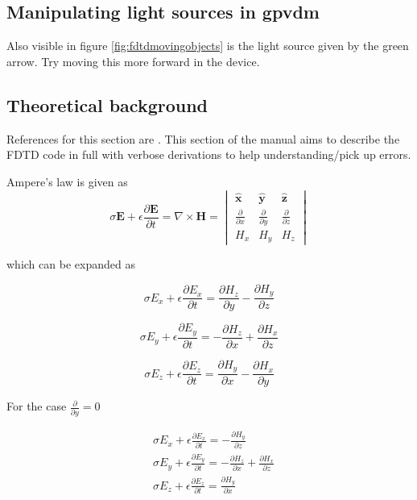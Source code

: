 \subsection{Manipulating light sources in gpvdm}
 Also visible in figure \ref{fig:fdtdmovingobjects} is the light source given by the green arrow. Try moving this more forward in the device.

\subsection{Theoretical background}
References for this section are \cite{FDTD_Schneider}. This section of the manual aims to describe the FDTD code in full with verbose derivations to help understanding/pick up errors.

Ampere’s law is given as  \cite{FDTD_Schneider}
\begin{equation}
\sigma  \boldsymbol{E} + \epsilon \frac{\partial  \boldsymbol{E}}{\partial t} = \nabla \times \boldsymbol{H} =
\begin{vmatrix} \hat{\boldsymbol{x}} & \hat{\boldsymbol{y}} & \hat{\boldsymbol{z}} \\ 
\frac{\partial}{\partial x} & \frac{\partial}{\partial y} & \frac{\partial}{\partial z} \\ 
H_{x} & H_{y} & H_{z}
\end{vmatrix}
\end{equation}


which can be expanded as

\begin{equation}
\sigma  E_{x} + \epsilon \frac{\partial  E_{x}}{\partial t} = \frac{\partial  H_{z}}{\partial y}-\frac{\partial  H_{y}}{\partial z}
\end{equation}

\begin{equation}
\sigma  E_{y} + \epsilon \frac{\partial  E_{y}}{\partial t} = -\frac{\partial  H_{z}}{\partial x}+\frac{\partial  H_{x}}{\partial z}
\end{equation}

\begin{equation}
\sigma  E_{z} + \epsilon \frac{\partial  E_{z}}{\partial t} = \frac{\partial  H_{y}}{\partial x}-\frac{\partial  H_{x}}{\partial y}
\end{equation}


For the case $\frac{\partial}{\partial y}=0$

\begin{equation}
\begin{split}
&\sigma  E_{x} + \epsilon \frac{\partial  E_{x}}{\partial t} =-\frac{\partial  H_{y}}{\partial z}\\
&\sigma  E_{y} + \epsilon \frac{\partial  E_{y}}{\partial t} = -\frac{\partial  H_{z}}{\partial x}+\frac{\partial  H_{x}}{\partial z}\\
&\sigma  E_{z} + \epsilon \frac{\partial  E_{z}}{\partial t} = \frac{\partial  H_{y}}{\partial x}
\end{split}
\end{equation}

